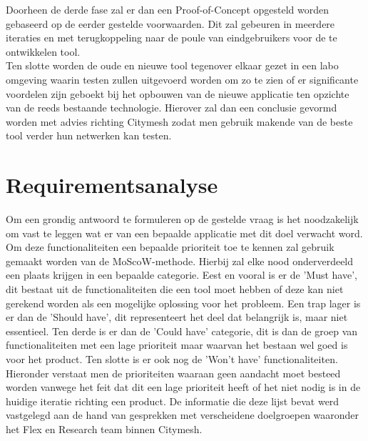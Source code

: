 Doorheen de derde fase zal er dan een Proof-of-Concept opgesteld worden gebaseerd op de eerder gestelde voorwaarden. Dit zal gebeuren in meerdere iteraties en met terugkoppeling naar de poule van eindgebruikers voor de te ontwikkelen tool. \\

Ten slotte worden de oude en nieuwe tool tegenover elkaar gezet in een labo omgeving waarin testen zullen uitgevoerd worden om zo te zien of er significante voordelen zijn geboekt bij het opbouwen van de nieuwe applicatie ten opzichte van de reeds bestaande technologie. Hierover zal dan een conclusie gevormd worden met advies richting Citymesh zodat men gebruik makende van de beste tool verder hun netwerken kan testen.

\section{Requirementsanalyse}

Om een grondig antwoord te formuleren op de gestelde vraag is het noodzakelijk om vast te leggen wat er van een bepaalde applicatie met dit doel verwacht word. Om deze functionaliteiten een bepaalde prioriteit toe te kennen zal gebruik gemaakt worden van de MoScoW-methode. Hierbij zal elke nood onderverdeeld een plaats krijgen in een bepaalde categorie. Eest en vooral is er de 'Must have', dit bestaat uit de functionaliteiten die een tool moet hebben of deze kan niet gerekend worden als een mogelijke oplossing voor het probleem. Een trap lager is er dan de 'Should have', dit representeert het deel dat belangrijk is, maar niet essentieel. Ten derde is er dan de 'Could have' categorie, dit is dan de groep van functionaliteiten met een lage prioriteit maar waarvan het bestaan wel goed is voor het product. Ten slotte is er ook nog de 'Won't have' functionaliteiten. Hieronder verstaat men de prioriteiten waaraan geen aandacht moet besteed worden vanwege het feit dat dit een lage prioriteit heeft of het niet nodig is in de huidige iteratie richting een product. \autocite{Khan2015} De informatie die deze lijst bevat werd vastgelegd aan de hand van gesprekken met verscheidene doelgroepen waaronder het Flex en Research team binnen Citymesh.

